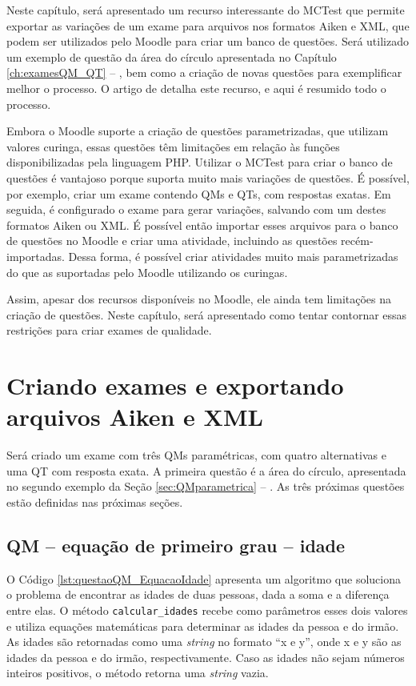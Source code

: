  \label{ch:examesQM_QT_Moodle}

Neste capítulo, será apresentado um recurso interessante do MCTest que permite exportar as variações de um exame para arquivos nos formatos Aiken e XML, que podem ser utilizados pelo Moodle para criar um banco de questões. Será utilizado um exemplo de questão da área do círculo apresentada no Capítulo \ref{ch:examesQM_QT} -- , bem como a criação de novas questões para exemplificar melhor o processo. O artigo de  detalha este recurso, e aqui é resumido todo o processo.

Embora o Moodle suporte a criação de questões parametrizadas, que utilizam valores curinga, essas questões têm limitações em relação às funções disponibilizadas pela linguagem PHP. Utilizar o MCTest para criar o banco de questões é vantajoso porque suporta muito mais variações de questões. É possível, por exemplo, criar um exame contendo QMs e QTs, com respostas exatas. Em seguida, é configurado o exame para gerar variações, salvando com um destes formatos Aiken ou XML. É possível então importar esses arquivos para o banco de questões no Moodle e criar uma atividade, incluindo as questões recém-importadas. Dessa forma, é possível criar atividades muito mais parametrizadas do que as suportadas pelo Moodle utilizando os curingas.

Assim, apesar dos recursos disponíveis no Moodle, ele ainda tem limitações na criação de questões. Neste capítulo, será apresentado como tentar contornar essas restrições para criar exames de qualidade.

\section{Criando exames e exportando arquivos Aiken e XML}

Será criado um exame com três QMs paramétricas, com quatro alternativas e uma QT com resposta exata. A primeira questão é a área do círculo, apresentada no segundo exemplo da Seção \ref{sec:QMparametrica} -- . As três próximas questões estão definidas nas próximas seções.

\subsection{QM -- equação de primeiro grau -- idade}

O Código \ref{lst:questaoQM_EquacaoIdade} apresenta um algoritmo que soluciona o problema de encontrar as idades de duas pessoas, dada a soma e a diferença entre elas. O método \verb|calcular_idades| recebe como parâmetros esses dois valores e utiliza equações matemáticas para determinar as idades da pessoa e do irmão. As idades são retornadas como uma \textit{string} no formato ``x e y'', onde x e y são as idades da pessoa e do irmão, respectivamente. Caso as idades não sejam números inteiros positivos, o método retorna uma \textit{string} vazia.

